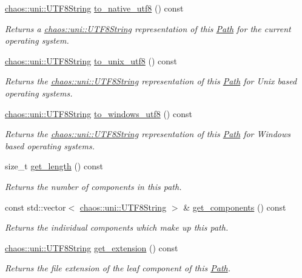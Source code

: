 \begin{DoxyCompactItemize}
\hyperlink{classchaos_1_1uni_1_1_u_t_f8_string}{chaos\+::uni\+::\+U\+T\+F8\+String} \hyperlink{classchaos_1_1io_1_1sys_1_1_path_a54f385bf11c8bf289adfb6ac3e8e9d46}{to\+\_\+native\+\_\+utf8} () const 
\begin{DoxyCompactList}\small\item\em Returns a \hyperlink{classchaos_1_1uni_1_1_u_t_f8_string}{chaos\+::uni\+::\+U\+T\+F8\+String} representation of this \hyperlink{classchaos_1_1io_1_1sys_1_1_path}{Path} for the current operating system. \end{DoxyCompactList}\item 
\hyperlink{classchaos_1_1uni_1_1_u_t_f8_string}{chaos\+::uni\+::\+U\+T\+F8\+String} \hyperlink{classchaos_1_1io_1_1sys_1_1_path_aa748ab64ab5d3b0efcd72a25947b5f35}{to\+\_\+unix\+\_\+utf8} () const 
\begin{DoxyCompactList}\small\item\em Returns the \hyperlink{classchaos_1_1uni_1_1_u_t_f8_string}{chaos\+::uni\+::\+U\+T\+F8\+String} representation of this \hyperlink{classchaos_1_1io_1_1sys_1_1_path}{Path} for Unix based operating systems. \end{DoxyCompactList}\item 
\hyperlink{classchaos_1_1uni_1_1_u_t_f8_string}{chaos\+::uni\+::\+U\+T\+F8\+String} \hyperlink{classchaos_1_1io_1_1sys_1_1_path_a02ef021f45851068ac79e9cd25c88298}{to\+\_\+windows\+\_\+utf8} () const 
\begin{DoxyCompactList}\small\item\em Returns the \hyperlink{classchaos_1_1uni_1_1_u_t_f8_string}{chaos\+::uni\+::\+U\+T\+F8\+String} representation of this \hyperlink{classchaos_1_1io_1_1sys_1_1_path}{Path} for Windows based operating systems. \end{DoxyCompactList}\item 
size\+\_\+t \hyperlink{classchaos_1_1io_1_1sys_1_1_path_a622fadb20bc01a0b58ef19eaf37fb44c}{get\+\_\+length} () const 
\begin{DoxyCompactList}\small\item\em Returns the number of components in this path. \end{DoxyCompactList}\item 
const std\+::vector$<$ \hyperlink{classchaos_1_1uni_1_1_u_t_f8_string}{chaos\+::uni\+::\+U\+T\+F8\+String} $>$ \& \hyperlink{classchaos_1_1io_1_1sys_1_1_path_ae20cae838af510b945e716d529e19bf4}{get\+\_\+components} () const 
\begin{DoxyCompactList}\small\item\em Returns the individual components which make up this path. \end{DoxyCompactList}\item 
\hyperlink{classchaos_1_1uni_1_1_u_t_f8_string}{chaos\+::uni\+::\+U\+T\+F8\+String} \hyperlink{classchaos_1_1io_1_1sys_1_1_path_ac7a2b7c374c1e4059b021b2c8751fb39}{get\+\_\+extension} () const 
\begin{DoxyCompactList}\small\item\em Returns the file extension of the leaf component of this \hyperlink{classchaos_1_1io_1_1sys_1_1_path}{Path}. \end{DoxyCompactList}\end{DoxyCompactItemize}
